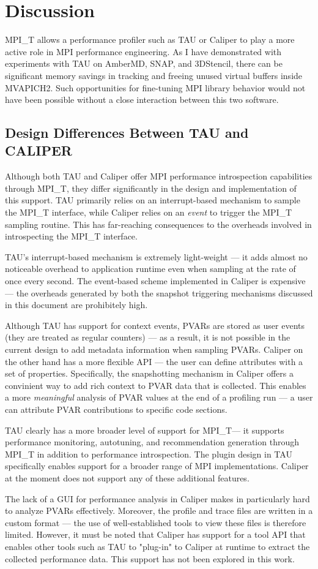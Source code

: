 \chapter{Discussion}

MPI\_T allows a performance profiler such as TAU or Caliper to play a more active role in MPI performance engineering. As I have demonstrated with experiments with TAU on AmberMD, SNAP, and 3DStencil, there can be significant memory savings in tracking and freeing unused virtual buffers inside MVAPICH2. Such opportunities for fine-tuning MPI library behavior would not have been possible without a close interaction between this two software.
\section{Design Differences Between TAU and CALIPER}
\par Although both TAU and Caliper offer MPI performance introspection capabilities through MPI\_T, they differ significantly in the design and implementation of this support. TAU primarily relies on an interrupt-based mechanism to sample the MPI\_T interface, while Caliper relies on an \textit{event} to trigger the MPI\_T sampling routine. This has far-reaching consequences to the overheads involved in introspecting the MPI\_T interface. 
\par TAU's interrupt-based mechanism is extremely light-weight --- it adds almost no noticeable overhead to application runtime even when sampling at the rate of once every second. The event-based scheme implemented in Caliper is expensive --- the overheads generated by both the snapshot triggering mechanisms discussed in this document are prohibitely high. 
\par Although TAU has support for context events, PVARs are stored as user events (they are treated as regular counters) --- as a result, it is not possible in the current design to add metadata information when sampling PVARs. Caliper on the other hand has a more flexible API --- the user can define attributes with a set of properties. Specifically, the snapshotting mechanism in Caliper offers a convinient way to add rich context to PVAR data that is collected. This enables a more \textit{meaningful} analysis of PVAR values at the end of a profiling run --- a user can attribute PVAR contributions to specific code sections.
\par TAU clearly has a more broader level of support for MPI\_T--- it supports performance monitoring, autotuning, and recommendation generation through MPI\_T in addition to performance introspection. The plugin design in TAU specifically enables support for a broader range of MPI implementations. Caliper at the moment does not support any of these additional features. 
\par The lack of a GUI for performance analysis in Caliper makes in particularly hard to analyze PVARs effectively. Moreover, the profile and trace files are written in a custom format --- the use of well-established tools to view these files is therefore limited. However, it must be noted that Caliper has support for a tool API that enables other tools such as TAU to "plug-in" to Caliper at runtime to extract the collected performance data. This support has not been explored in this work.
